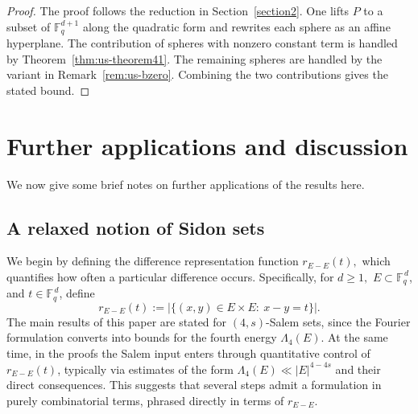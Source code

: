 \documentclass{article}
\begin{document}
\begin{proof}
The proof follows the reduction in Section~\ref{section2}.
One lifts $P$ to a subset of $\mathbb{F}_q^{d+1}$ along the quadratic form and rewrites each sphere as an affine hyperplane.
The contribution of spheres with nonzero constant term is handled by Theorem~\ref{thm:us-theorem41}.
The remaining spheres are handled by the variant in Remark~\ref{rem:us-bzero}.
Combining the two contributions gives the stated bound.
\end{proof}



\section{Further applications and discussion}\label{sec:s-sidon}

We now give some brief notes on further applications of the results here.

\subsection{A relaxed notion of Sidon sets}

We begin by defining the difference representation function $r_{E-E}(t),$ which quantifies how often a particular difference occurs. Specifically, for $d\ge 1,$ $E\subset \mathbb{F}_q^{\,d}$, and $t\in \mathbb{F}_q^{\,d}$, define
\[
r_{E-E}(t):=
\bigl|\{(x,y)\in E\times E:\ x-y=t\}\bigr|.
\]
The main results of this paper are stated for $(4,s)$-Salem sets, since the Fourier formulation converts into bounds for the fourth energy $\Lambda_4(E)$. At the same time, in the proofs the Salem input enters through quantitative control of $r_{E-E}(t)$, typically via estimates of the form $\Lambda_4(E)\ll |E|^{4-4s}$ and their direct consequences. This suggests that several steps admit a formulation in purely combinatorial terms, phrased directly in terms of $r_{E-E}$.
\end{document}
